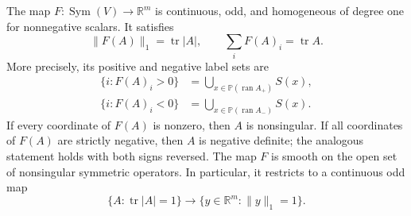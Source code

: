 \begin{lemma}
\label{lem:signed-extension}
The map $F:\operatorname{Sym}(V)\to\mathbb R^m$ is continuous, odd,
and homogeneous of degree one for nonnegative scalars.  It satisfies
\begin{equation}
 \|F(A)\|_1=\operatorname{tr}|A|,
 \qquad \sum_iF(A)_i=\operatorname{tr}A.
 \label{eq:extension-norms}
\end{equation}
More precisely, its positive and negative label sets are
\begin{equation}
\begin{aligned}
 \{i:F(A)_i>0\}&=\bigcup_{x\in\mathbb P(\operatorname{ran}A_+)}S(x),\\
 \{i:F(A)_i<0\}&=\bigcup_{x\in\mathbb P(\operatorname{ran}A_-)}S(x).
\end{aligned}
 \label{eq:spectral-support}
\end{equation}
If every coordinate of $F(A)$ is nonzero, then $A$ is nonsingular.
If all coordinates of $F(A)$ are strictly negative, then $A$ is negative
definite; the analogous statement holds with both signs reversed.
The map $F$ is smooth on the open set of nonsingular symmetric operators.
In particular, it restricts to a continuous odd map
\begin{equation}
 \{A:\operatorname{tr}|A|=1\}\longrightarrow
 \{y\in\mathbb R^m:\|y\|_1=1\}.
 \label{eq:norm-sphere-map}
\end{equation}
\end{lemma}

